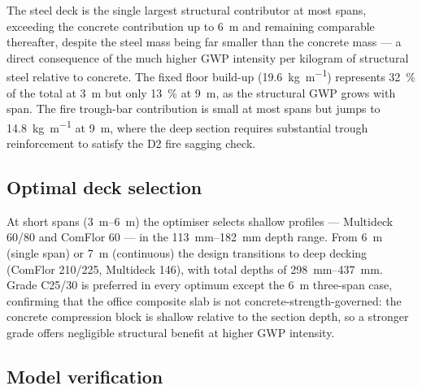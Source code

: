The steel deck is the single largest structural contributor at most spans, exceeding the concrete contribution up to \SI{6}{\meter} and remaining comparable thereafter, despite the steel mass being far smaller than the concrete mass --- a direct consequence of the much higher GWP intensity per kilogram of structural steel relative to concrete. The fixed floor build-up (\SI{19.6}{\kilo\gram\per\meter}) represents \SI{32}{\percent} of the total at \SI{3}{\meter} but only \SI{13}{\percent} at \SI{9}{\meter}, as the structural GWP grows with span. The fire trough-bar contribution is small at most spans but jumps to \SI{14.8}{\kilo\gram\per\meter} at \SI{9}{\meter}, where the deep section requires substantial trough reinforcement to satisfy the D2 fire sagging check.


\subsection{Optimal deck selection}
\label{sec:res_sections_office}
At short spans (\SIrange{3}{6}{\meter}) the optimiser selects shallow profiles --- Multideck 60/80 and ComFlor 60 --- in the \SIrange{113}{182}{\milli\meter} depth range. From \SI{6}{\meter} (single span) or \SI{7}{\meter} (continuous) the design transitions to deep decking (ComFlor 210/225, Multideck 146), with total depths of \SIrange{298}{437}{\milli\meter}. Grade C25/30 is preferred in every optimum except the \SI{6}{\meter} three-span case, confirming that the office composite slab is not concrete-strength-governed: the concrete compression block is shallow relative to the section depth, so a stronger grade offers negligible structural benefit at higher GWP intensity.

\subsection{Model verification}
\label{sec:res_verif_office}

